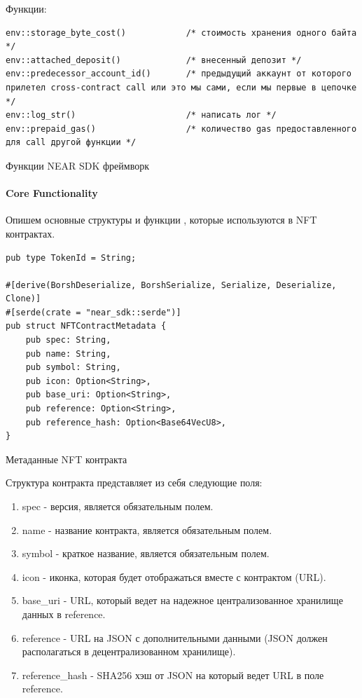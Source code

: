 Функции:
\begin{listing}[H]
\begin{verbatim}
env::storage_byte_cost()            /* стоимость хранения одного байта */
env::attached_deposit()             /* внесенный депозит */
env::predecessor_account_id()       /* предыдущий аккаунт от которого прилетел cross-contract call или это мы сами, если мы первые в цепочке */
env::log_str()                      /* написать лог */
env::prepaid_gas()                  /* количество gas предоставленного для call другой функции */
\end{verbatim}
\caption{Функции NEAR SDK фреймворк}
\label{near.functions}
\end{listing}

\paragraph{Core Functionality}

Опишем основные структуры и функции \cite{corestandard}, которые используются в NFT контрактах.

\begin{listing}[H]
\begin{verbatim}
pub type TokenId = String;

#[derive(BorshDeserialize, BorshSerialize, Serialize, Deserialize, Clone)]
#[serde(crate = "near_sdk::serde")]
pub struct NFTContractMetadata {
    pub spec: String,
    pub name: String,
    pub symbol: String,
    pub icon: Option<String>,
    pub base_uri: Option<String>,
    pub reference: Option<String>,
    pub reference_hash: Option<Base64VecU8>,
}
\end{verbatim}
\caption{Метаданные NFT контракта}
\label{nftcontract.metadata}
\end{listing}

Структура контракта представляет из себя следующие поля:
\begin{enumerate}
\item spec - версия, является обязательным полем.
\item name - название контракта, является обязательным полем.
\item symbol - краткое название, является обязательным полем.
\item icon - иконка, которая будет отображаться вместе с контрактом (URL).
\item base\_uri - URL, который ведет на надежное централизованное хранилище данных в reference.
\item reference - URL на JSON с дополнительными данными (JSON должен располагаться в децентрализованном хранилище).
\item reference\_hash - SHA256 хэш от JSON на который ведет URL в поле reference.
\end{enumerate}


